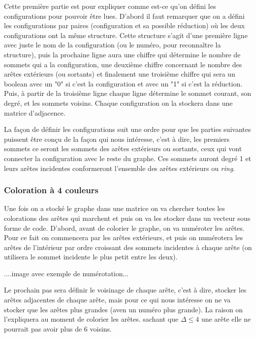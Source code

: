 \documentclass[10pt,a4paper]{article}
\begin{document}
Cette première partie est pour expliquer comme est-ce qu'on défini les configurations pour pouvoir être lues. D'abord il  faut remarquer que on a défini les configurations par paires (configuration et sa possible réduction) où les deux configurations ont la même structure. Cette structure s'agit d'une première ligne avec juste le nom de la configuration (ou le numéro, pour reconnaître la structure), puis la prochaine ligne aura une chiffre qui détermine le nombre de sommets qui a la configuration, une deuxième chiffre concernant le nombre des arêtes extérieurs (ou sortants) et finalement une troisième chiffre qui sera un boolean avec un "0" si c'est la configuration et avec un "1" si c'est la réduction. Puis, à partir de la troisième ligne chaque ligne détermine le sommet courant, son degré, et les sommets voisins. Chaque configuration on la stockera dans une matrice d'adjacence.

La façon de définir les configurations suit une ordre pour que les parties suivantes puissent être conçu de la façon qui nous intéresse, c'est à dire, les premiers sommets ce seront les sommets des arêtes extérieurs ou sortants, ceux qui vont connecter la configuration avec le reste du graphe. Ces sommets auront degré 1 et leurs arêtes incidentes conformeront l'ensemble des arêtes extérieurs ou \emph{ring}.


\subsubsection{Coloration à 4 couleurs}

Une fois on a stocké le graphe dans une matrice on va chercher toutes les colorations des arêtes qui marchent et puis on va les stocker dans un vecteur sous forme de code. D'abord, avant de colorier le graphe, on va numéroter les arêtes. Pour ce fait on commencera par les arêtes extérieurs, et puis on numérotera les arêtes de l'intérieur par ordre croissant des sommets incidentes à chaque arête (on utilisera le sommet incidente le plus petit entre les deux).

....image avec exemple de numérotation...

Le prochain pas sera définir le voisinage de chaque arête, c'est à dire, stocker les arêtes adjacentes de chaque arête, mais pour ce qui nous intéresse on ne va stocker que les arêtes plus grandes (aven un numéro plus grande). La raison on l'expliquera au moment de colorier les arêtes. sachant que $\Delta \leq 4$ une arête elle ne pourrait pas avoir plus de 6 voisins.
\end{document}
